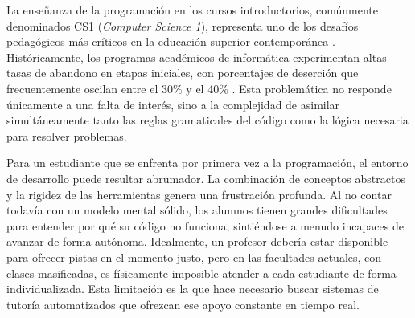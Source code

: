 La enseñanza de la programación en los cursos introductorios, comúnmente denominados CS1 (\textit{Computer Science 1}), representa uno de los desafíos pedagógicos más críticos en la educación superior contemporánea \cite{alshaikh2020socratic}. Históricamente, los programas académicos de informática experimentan altas tasas de abandono en etapas iniciales, con porcentajes de deserción que frecuentemente oscilan entre el 30\% y el 40\% \cite{beaubouef2005why}. Esta problemática no responde únicamente a una falta de interés, sino a la complejidad de asimilar simultáneamente tanto las reglas gramaticales del código como la lógica necesaria para resolver problemas.

Para un estudiante que se enfrenta por primera vez a la programación, el entorno de desarrollo puede resultar abrumador. La combinación de conceptos abstractos y la rigidez de las herramientas genera una frustración profunda. Al no contar todavía con un modelo mental sólido, los alumnos tienen grandes dificultades para entender por qué su código no funciona, sintiéndose a menudo incapaces de avanzar de forma autónoma. Idealmente, un profesor debería estar disponible para ofrecer pistas en el momento justo, pero en las facultades actuales, con clases masificadas, es físicamente imposible atender a cada estudiante de forma individualizada. Esta limitación es la que hace necesario buscar sistemas de tutoría automatizados que ofrezcan ese apoyo constante en tiempo real.